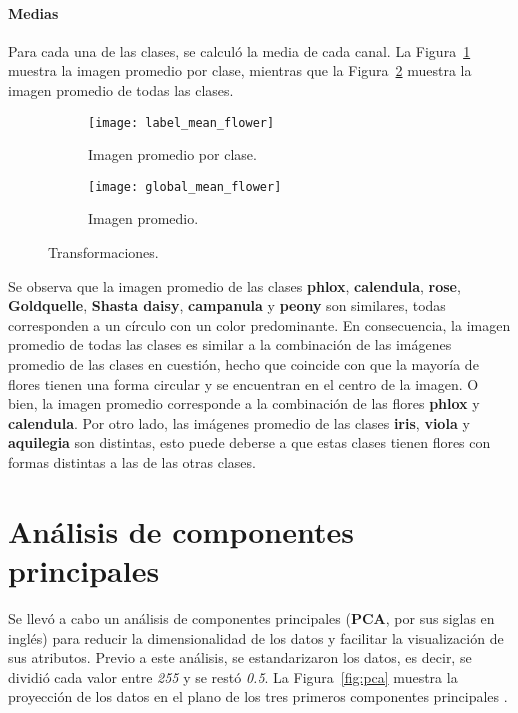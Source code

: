 \documentclass{article}
\begin{document}
\paragraph{Medias}

Para cada una de las clases, se calculó la media de cada canal. La Figura~\ref{fig:label_mean_flower} muestra la imagen promedio por clase, mientras que la Figura~\ref{fig:global_mean_flower} muestra la imagen promedio de todas las clases.

\begin{figure}[H]
  \centering
  \begin{subfigure}[H]{0.79\textwidth}
      \centering
      \texttt{[image: label\_mean\_flower]}
      \caption{Imagen promedio por clase.}
      \label{fig:label_mean_flower}
  \end{subfigure}
  \begin{subfigure}[H]{0.2\textwidth}
    \centering
    \texttt{[image: global\_mean\_flower]}
    \caption{Imagen promedio.}
    \label{fig:global_mean_flower}
  \end{subfigure}
    \caption{Transformaciones.}
    \label{fig:transformaciones}
\end{figure}

Se observa que la imagen promedio de las clases \textbf{phlox}, \textbf{calendula}, \textbf{rose}, \textbf{Goldquelle}, \textbf{Shasta daisy}, \textbf{campanula} y \textbf{peony} son similares, todas corresponden a un círculo con un color predominante. En consecuencia, la imagen promedio de todas las clases es similar a la combinación de las imágenes promedio de las clases en cuestión, hecho que coincide con que la mayoría de flores tienen una forma circular y se encuentran en el centro de la imagen. O bien, la imagen promedio corresponde a la combinación de las flores \textbf{phlox} y \textbf{calendula}. Por otro lado, las imágenes promedio de las clases \textbf{iris}, \textbf{viola} y \textbf{aquilegia} son distintas, esto puede deberse a que estas clases tienen flores con formas distintas a las de las otras clases.

\section{Análisis de componentes principales}

Se llevó a cabo un análisis de componentes principales (\textbf{PCA}, por sus siglas en inglés) para reducir la dimensionalidad de los datos y facilitar la visualización de sus atributos. Previo a este análisis, se estandarizaron los datos, es decir, se dividió cada valor entre \textit{255} y se restó \textit{0.5}. La Figura~\ref{fig:pca} muestra la proyección de los datos en el plano de los tres primeros componentes principales \cite{Jolliffe1986}.
\end{document}

